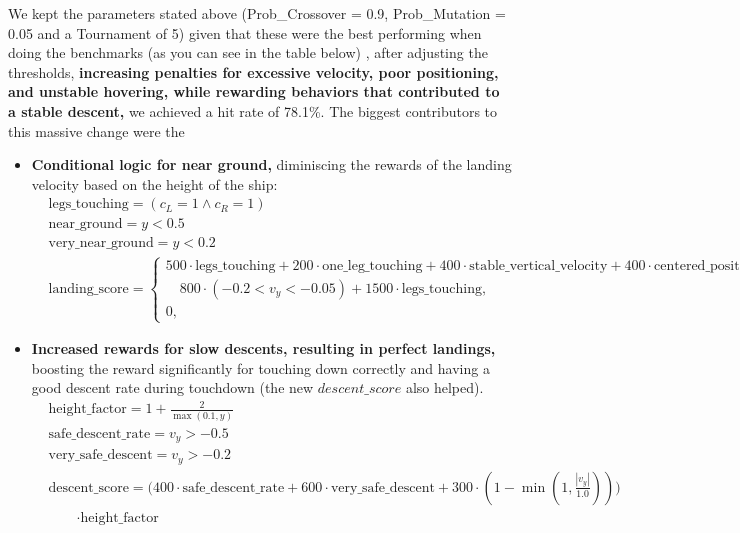 \documentclass[a4paper, 12pt, fleqn]{report}
\begin{document}
\noindent
We kept the parameters stated above (Prob\_Crossover = 0.9, Prob\_Mutation = 0.05 and a Tournament of 5) given that these were the best performing when doing the benchmarks (as you can see in the table below)
, after adjusting the thresholds, \textbf{increasing penalties for excessive velocity, poor positioning, and unstable hovering, while rewarding behaviors that contributed to a stable descent,} we achieved a hit rate of 78.1\%.
The biggest contributors to this massive change were the
\begin{itemize}
        \item \textbf{Conditional logic for near ground,} diminiscing the rewards of the landing velocity based on the height of the ship:
        {\scriptsize
        \begin{align*}
            & \text{legs\_touching} = (c_L = 1 \land c_R = 1) \\
            & \text{near\_ground} = y < 0.5 \\
            & \text{very\_near\_ground} = y < 0.2 \\
            & \text{landing\_score} =
            \begin{cases}
                500 \cdot \text{legs\_touching} +
                200 \cdot \text{one\_leg\_touching} +
                400 \cdot \text{stable\_vertical\_velocity} +
                400 \cdot \text{centered\_position} + {} \\
                \quad 800 \cdot (-0.2 < v_y < -0.05) +
                1500 \cdot \text{legs\_touching}, 
                & \text{if near\_ground and very\_near\_ground} \\
                0, & \text{otherwise}
            \end{cases}
        \end{align*}
        }
        \item \textbf{Increased rewards for slow descents, resulting in perfect landings,} boosting the reward significantly for touching down correctly and having a good descent rate during touchdown (the new $descent\_score$ also helped).
        {\scriptsize
        \begin{align*}
        & \text{height\_factor} = 1 + \frac{2}{\max(0.1, y)} \\[0.5em]
        & \text{safe\_descent\_rate} = v_y > -0.5 \\
        & \text{very\_safe\_descent} = v_y > -0.2 \\
        & \text{descent\_score} =
        \Big( 400 \cdot \text{safe\_descent\_rate} + 
                600 \cdot \text{very\_safe\_descent} +
                300 \cdot \left(1 - \min\left(1, \tfrac{|v_y|}{1.0}\right)\right) \Big)
        \\[0.2em]
        & \qquad \cdot \text{height\_factor} \\[0.5em]
        \end{align*}
        }
        \end{itemize}
\end{document}
